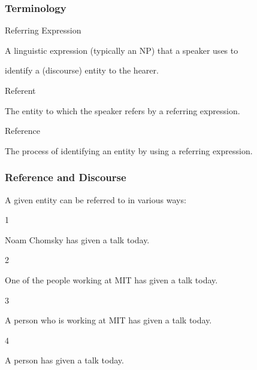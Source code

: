 \documentclass[compress,color=usenames]{beamer}
\begin{document}
\begin{frame}
\frametitle{Terminology}






Referring Expression



A linguistic expression (typically an NP) that a speaker uses to



identify a (discourse) entity to the hearer.



Referent



The entity to which the speaker refers by a referring expression.



Reference



The process of identifying an entity by using a referring expression.










\end{frame}
\begin{frame}
\frametitle{
Reference and Discourse}






A given entity can be referred to in various ways:


1






Noam Chomsky has given a talk today.





2






One of the people working at MIT has given a talk today.





3






A person who is working at MIT has given a talk today.





4






A person has given a talk today.










\end{frame}
\end{document}
